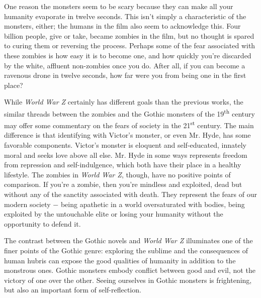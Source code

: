 \documentclass{article}
\begin{document}
\begin{doublespace}
One reason the monsters seem to be scary because they can make all your humanity evaporate in twelve seconds. This isn't simply a characteristic of the monsters, either; the humans in the film also seem to acknowledge this. Four billion people, give or take, became zombies in the film, but no thought is spared to curing them or reversing the process. Perhaps some of the fear associated with these zombies is how easy it is to become one, and how quickly you're discarded by the white, affluent non-zombies once you do. After all, if you can become a ravenous drone in twelve seconds, how far were you from being one in the first place?

While \textit{World War Z} certainly has different goals than the previous works, the similar threads between the zombies and the Gothic monsters of the 19\textsuperscript{th} century may offer some commentary on the fears of society in the 21\textsuperscript{st} century. The main difference is that identifying with Victor's monster, or even Mr. Hyde, has some favorable components. Victor's monster is eloquent and self-educated, innately moral and seeks love above all else. Mr. Hyde in some ways represents freedom from repression and self-indulgence, which both have their place in a healthy lifestyle. The zombies in \textit{World War Z}, though, have no positive points of comparison. If you're a zombie, then you're mindless and exploited, dead but without any of the sanctity associated with death. They represent the fears of our modern society $-$ being apathetic in a world oversaturated with bodies, being exploited by the untouchable elite or losing your humanity without the opportunity to defend it.

The contrast between the Gothic novels and \textit{World War Z} illuminates one of the finer points of the Gothic genre: exploring the sublime and the consequences of human hubris can expose the good qualities of humanity in addition to the monstrous ones. Gothic monsters embody conflict between good and evil, not the victory of one over the other. Seeing ourselves in Gothic monsters is frightening, but also an important form of self-reflection.

\end{doublespace}
\end{document}
